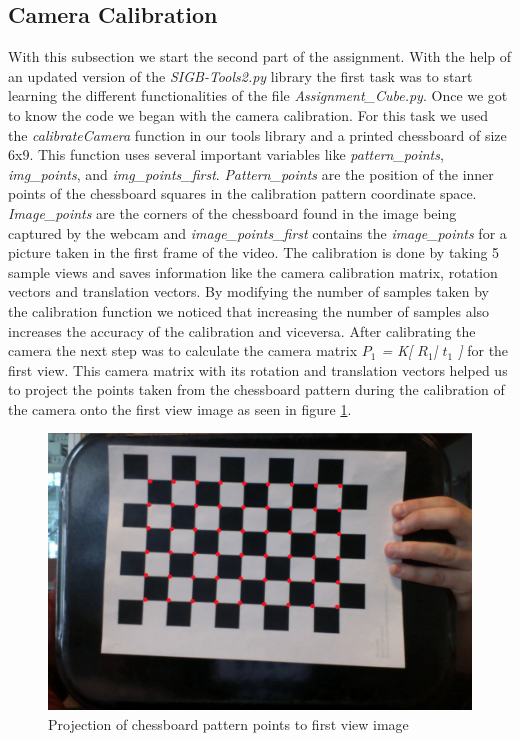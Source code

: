 \subsection{Camera Calibration}
With this subsection we start the second part of the assignment. With the help of an updated version of the \textsl{SIGB-Tools2.py} library the first task was to start learning the different functionalities of the file \textsl{Assignment_Cube.py}. Once we got to know the code we began with the camera calibration. For this task we used the \textsl{calibrateCamera} function in our tools library and a printed chessboard of size 6x9. This function uses several important variables like \textsl{pattern_points}, \textsl{img_points}, and \textsl{img_points_first}.  \textsl{Pattern_points} are the position of the inner points of the chessboard squares in the calibration pattern coordinate space. \textsl{Image_points} are the corners of the chessboard found in the image being captured by the webcam and  \textsl{image_points_first} contains the \textsl{image_points} for a picture taken in the first frame of the video. 
The calibration is done by taking 5 sample views and saves information like the camera calibration matrix, rotation vectors and translation vectors. By modifying the number of samples taken by the calibration function we noticed that increasing the number of samples also increases the accuracy of the calibration and viceversa.\newline 
After calibrating the camera the next step was to calculate the camera matrix  \textsl{ \(P_1\) = K[ \(R_1\)| \(t_1\) ]} for the first view. This camera matrix with its rotation and translation vectors helped us to project the points taken from the chessboard pattern during the calibration of the camera onto the first view image as seen in figure \ref{fig:projection}. 
\begin{figure}
	\centering
	\includegraphics[scale=0.9]{images/projection_p1.jpg}
	\caption{Projection of chessboard pattern points to first view image}
	\label{fig:projection}
\end{figure}

